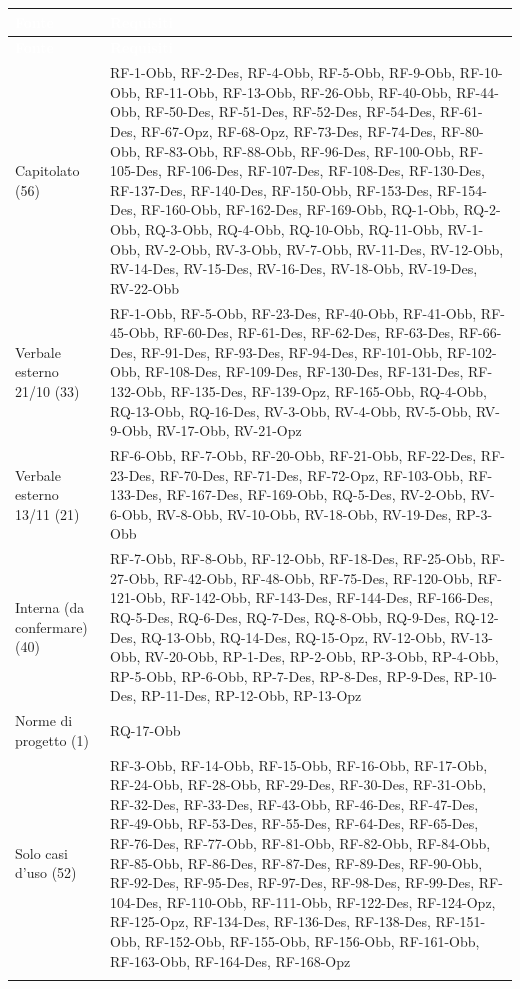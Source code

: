 \documentclass[12pt,a4paper]{article}
\newcommand{\thc}[1]{\textcolor{white}{\textbf{#1}}}
\newcommand{\rl}{\\ \arrayrulecolor{bfline}\hline}
\begin{document}
\begin{longtable}{>{\raggedright\arraybackslash}p{}>{\raggedright\arraybackslash}p{}}
\rowcolor{bfblue}\thc{Fonte} & \thc{Requisiti} \\
\endfirsthead
\rowcolor{bfblue}\thc{Fonte} & \thc{Requisiti} \\
\endhead
Capitolato (56) & RF-1-Obb, RF-2-Des, RF-4-Obb, RF-5-Obb, RF-9-Obb, RF-10-Obb, RF-11-Obb, RF-13-Obb, RF-26-Obb, RF-40-Obb, RF-44-Obb, RF-50-Des, RF-51-Des, RF-52-Des, RF-54-Des, RF-61-Des, RF-67-Opz, RF-68-Opz, RF-73-Des, RF-74-Des, RF-80-Obb, RF-83-Obb, RF-88-Obb, RF-96-Des, RF-100-Obb, RF-105-Des, RF-106-Des, RF-107-Des, RF-108-Des, RF-130-Des, RF-137-Des, RF-140-Des, RF-150-Obb, RF-153-Des, RF-154-Des, RF-160-Obb, RF-162-Des, RF-169-Obb, RQ-1-Obb, RQ-2-Obb, RQ-3-Obb, RQ-4-Obb, RQ-10-Obb, RQ-11-Obb, RV-1-Obb, RV-2-Obb, RV-3-Obb, RV-7-Obb, RV-11-Des, RV-12-Obb, RV-14-Des, RV-15-Des, RV-16-Des, RV-18-Obb, RV-19-Des, RV-22-Obb \rl
Verbale esterno 21/10 (33) & RF-1-Obb, RF-5-Obb, RF-23-Des, RF-40-Obb, RF-41-Obb, RF-45-Obb, RF-60-Des, RF-61-Des, RF-62-Des, RF-63-Des, RF-66-Des, RF-91-Des, RF-93-Des, RF-94-Des, RF-101-Obb, RF-102-Obb, RF-108-Des, RF-109-Des, RF-130-Des, RF-131-Des, RF-132-Obb, RF-135-Des, RF-139-Opz, RF-165-Obb, RQ-4-Obb, RQ-13-Obb, RQ-16-Des, RV-3-Obb, RV-4-Obb, RV-5-Obb, RV-9-Obb, RV-17-Obb, RV-21-Opz \rl
Verbale esterno 13/11 (21) & RF-6-Obb, RF-7-Obb, RF-20-Obb, RF-21-Obb, RF-22-Des, RF-23-Des, RF-70-Des, RF-71-Des, RF-72-Opz, RF-103-Obb, RF-133-Des, RF-167-Des, RF-169-Obb, RQ-5-Des, RV-2-Obb, RV-6-Obb, RV-8-Obb, RV-10-Obb, RV-18-Obb, RV-19-Des, RP-3-Obb \rl
Interna (da confermare) (40) & RF-7-Obb, RF-8-Obb, RF-12-Obb, RF-18-Des, RF-25-Obb, RF-27-Obb, RF-42-Obb, RF-48-Obb, RF-75-Des, RF-120-Obb, RF-121-Obb, RF-142-Obb, RF-143-Des, RF-144-Des, RF-166-Des, RQ-5-Des, RQ-6-Des, RQ-7-Des, RQ-8-Obb, RQ-9-Des, RQ-12-Des, RQ-13-Obb, RQ-14-Des, RQ-15-Opz, RV-12-Obb, RV-13-Obb, RV-20-Obb, RP-1-Des, RP-2-Obb, RP-3-Obb, RP-4-Obb, RP-5-Obb, RP-6-Obb, RP-7-Des, RP-8-Des, RP-9-Des, RP-10-Des, RP-11-Des, RP-12-Obb, RP-13-Opz \rl
Norme di progetto (1) & RQ-17-Obb \rl
Solo casi d'uso (52) & RF-3-Obb, RF-14-Obb, RF-15-Obb, RF-16-Obb, RF-17-Obb, RF-24-Obb, RF-28-Obb, RF-29-Des, RF-30-Des, RF-31-Obb, RF-32-Des, RF-33-Des, RF-43-Obb, RF-46-Des, RF-47-Des, RF-49-Obb, RF-53-Des, RF-55-Des, RF-64-Des, RF-65-Des, RF-76-Des, RF-77-Obb, RF-81-Obb, RF-82-Obb, RF-84-Obb, RF-85-Obb, RF-86-Des, RF-87-Des, RF-89-Des, RF-90-Obb, RF-92-Des, RF-95-Des, RF-97-Des, RF-98-Des, RF-99-Des, RF-104-Des, RF-110-Obb, RF-111-Obb, RF-122-Des, RF-124-Opz, RF-125-Opz, RF-134-Des, RF-136-Des, RF-138-Des, RF-151-Obb, RF-152-Obb, RF-155-Obb, RF-156-Obb, RF-161-Obb, RF-163-Obb, RF-164-Des, RF-168-Opz \rl
\end{longtable}
\end{document}
